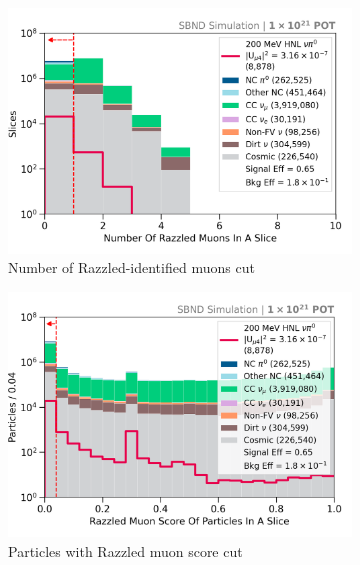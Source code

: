\begin{figure}[hb!]
        \begin{subfigure}[b]{0.495\textwidth}   
            \centering 
            \includegraphics[width=\textwidth]{nrazzled_muon_precut}
            \caption{Number of Razzled-identified muons cut}%
            \label{fig:nrazzled_muon_full}
        \end{subfigure}
        \hfill
        \begin{subfigure}[b]{0.495\textwidth}   
            \centering 
            \includegraphics[width=\textwidth]{razzled_muon_score_precut}
            \caption{Particles with Razzled muon score cut}%
            \label{fig:razzled_muon_score_full}
        \end{subfigure}
        \hfill
	\centering
        \begin{subfigure}[b]{0.495\textwidth}   

\end{subfigure}
\end{figure}
